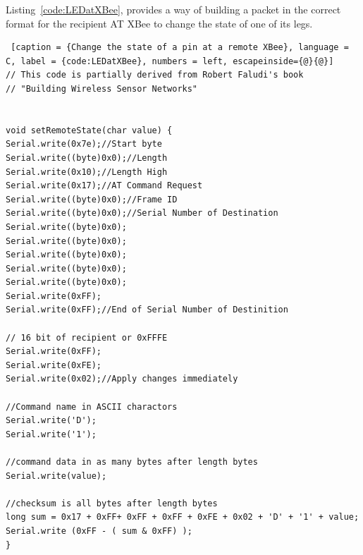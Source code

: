 Listing~\ref{code:LEDatXBee}, provides a way of building a packet in the correct format for the recipient AT XBee to change the state of one of its legs.

\begin{lstlisting} [caption = {Change the state of a pin at a remote XBee}, language = C, label = {code:LEDatXBee}, numbers = left, escapeinside={@}{@}]
// This code is partially derived from Robert Faludi's book
// "Building Wireless Sensor Networks"


void setRemoteState(char value) {
Serial.write(0x7e);//Start byte
Serial.write((byte)0x0);//Length
Serial.write(0x10);//Length High
Serial.write(0x17);//AT Command Request
Serial.write((byte)0x0);//Frame ID
Serial.write((byte)0x0);//Serial Number of Destination
Serial.write((byte)0x0);
Serial.write((byte)0x0);
Serial.write((byte)0x0);
Serial.write((byte)0x0);
Serial.write((byte)0x0);
Serial.write(0xFF);
Serial.write(0xFF);//End of Serial Number of Destinition

// 16 bit of recipient or 0xFFFE
Serial.write(0xFF);
Serial.write(0xFE);
Serial.write(0x02);//Apply changes immediately

//Command name in ASCII charactors
Serial.write('D');
Serial.write('1');

//command data in as many bytes after length bytes
Serial.write(value);

//checksum is all bytes after length bytes
long sum = 0x17 + 0xFF+ 0xFF + 0xFF + 0xFE + 0x02 + 'D' + '1' + value;
Serial.write (0xFF - ( sum & 0xFF) );
}

\end{lstlisting}

